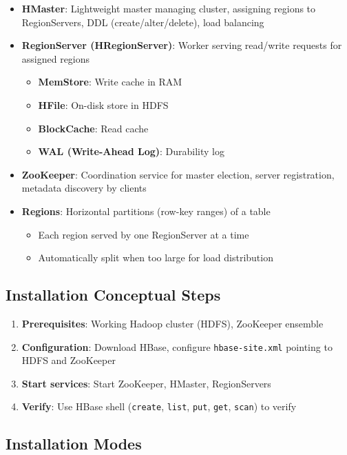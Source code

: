 \documentclass[11pt, onecolumn, a4paper]{article}
\begin{document}
\begin{itemize}
  \item \textbf{HMaster}: Lightweight master managing cluster, assigning regions to RegionServers, DDL (create/alter/delete), load balancing
  \item \textbf{RegionServer (HRegionServer)}: Worker serving read/write requests for assigned regions
  \begin{itemize}
    \item \textbf{MemStore}: Write cache in RAM
    \item \textbf{HFile}: On-disk store in HDFS
    \item \textbf{BlockCache}: Read cache
    \item \textbf{WAL (Write-Ahead Log)}: Durability log
  \end{itemize}
  \item \textbf{ZooKeeper}: Coordination service for master election, server registration, metadata discovery by clients
  \item \textbf{Regions}: Horizontal partitions (row-key ranges) of a table
  \begin{itemize}
    \item Each region served by one RegionServer at a time
    \item Automatically split when too large for load distribution
  \end{itemize}
\end{itemize}

\subsection{Installation Conceptual Steps}

\begin{enumerate}
  \item \textbf{Prerequisites}: Working Hadoop cluster (HDFS), ZooKeeper ensemble
  \item \textbf{Configuration}: Download HBase, configure \texttt{hbase-site.xml} pointing to HDFS and ZooKeeper
  \item \textbf{Start services}: Start ZooKeeper, HMaster, RegionServers
  \item \textbf{Verify}: Use HBase shell (\texttt{create}, \texttt{list}, \texttt{put}, \texttt{get}, \texttt{scan}) to verify
\end{enumerate}

\subsection{Installation Modes}
\end{document}
